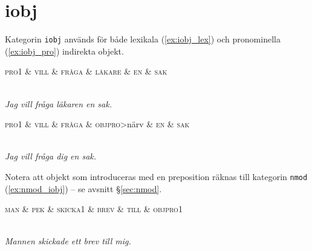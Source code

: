 \documentclass[11pt,a4paper]{article}
\begin{document}
\section{iobj}
Kategorin \texttt{iobj} används för både lexikala (\ref{ex:iobj_lex}) och pronominella (\ref{ex:iobj_pro}) indirekta objekt.

\begin{example}
\label{ex:iobj_lex}
\begin{dependency}[theme = simple]
   \begin{deptext}[column sep=1em]
      \textsc{pro1} \& \textsc{vill} \& \textsc{fråga} \& \textsc{läkare} \& \textsc{en} \& \textsc{sak} \\
   \end{deptext}
\end{dependency}
\\
\textit{Jag vill fråga läkaren en sak.}
\end{example}

\begin{example}
\label{ex:iobj_pro}
\begin{dependency}[theme = simple]
   \begin{deptext}[column sep=1em]
      \textsc{pro1} \& \textsc{vill} \& \textsc{fråga} \& \textsc{objpro}{\textgreater}närv \& \textsc{en} \& \textsc{sak} \\
   \end{deptext}
\end{dependency}
\\
\textit{Jag vill fråga dig en sak.}
\end{example}

\noindent Notera att objekt som introduceras med en preposition räknas till kategorin \texttt{nmod} (\ref{ex:nmod_iobj}) -- se avsnitt §\ref{sec:nmod}.

\begin{example}
\label{ex:nmod_iobj}
\begin{dependency}[theme = simple]
   \begin{deptext}[column sep=1em]
      \textsc{man} \& \textsc{pek} \& \textsc{skicka1} \& \textsc{brev} \& \textsc{till} \& \textsc{objpro1} \\
   \end{deptext}
\end{dependency}
\\
\textit{Mannen skickade ett brev till mig.}
\end{example}
\end{document}
